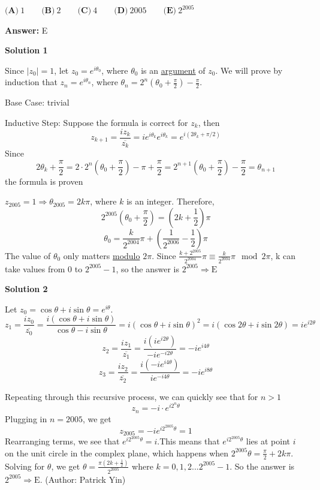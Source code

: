 \begin{enumerate}
 $\textbf{(A)}\ 1 \qquad  \textbf{(B)}\ 2 \qquad  \textbf{(C)}\ 4 \qquad  \textbf{(D)}\ 2005 \qquad  \textbf{(E)}\ 2^{2005}$

 \textbf{Answer: }E



\textbf{Solution 1}

Since $|z_0|=1$, let $z_0=e^{i\theta_0}$, where $\theta_0$ is an \href{https://artofproblemsolving.com/wiki/index.php?title=Argument}{argument} of $z_0$. We will prove by induction that $z_n=e^{i\theta_n}$, where $\theta_n=2^n(\theta_0+\frac{\pi}{2})-\frac{\pi}{2}$.

 Base Case: trivial

 Inductive Step: Suppose the formula is correct for $z_k$, then
 \[z_{k+1}=\frac{iz_k}{\overline {z_k}}=i e^{i\theta_k} e^{i\theta_k}=e^{i(2\theta_k+\pi/2)}\]Since
 \[2\theta_k+\frac{\pi}{2}=2\cdot 2^n(\theta_0+\frac{\pi}{2})-\pi+\frac{\pi}{2}=2^{n+1}(\theta_0+\frac{\pi}{2})-\frac{\pi}{2}=\theta_{n+1}\]the formula is proven

 $z_{2005}=1\Rightarrow \theta_{2005}=2k\pi$, where $k$ is an integer. Therefore,
 \[2^{2005}(\theta_0+\frac{\pi}{2})=(2k+\frac{1}{2})\pi\]
 \[\theta_0=\frac{k}{2^{2004}}\pi+\left(\frac{1}{2^{2006}}-\frac{1}{2}\right)\pi\]The value of $\theta_0$ only matters \href{https://artofproblemsolving.com/wiki/index.php?title=Modulo}{modulo} $2\pi$. Since $\frac{k+2^{2005}}{2^{2004}}\pi\equiv\frac{k}{2^{2004}}\pi\mod 2\pi$, k can take values from 0 to $2^{2005}-1$, so the answer is $2^{2005}\Rightarrow\boxed{\mathrm{E}}$




\textbf{Solution 2}

Let $z_0 = \cos \theta + i\sin \theta = e^{i\theta}$.
 \[z_1 = \frac {iz_{0}}{\overline {z_{0}}} = \frac{i(\cos \theta + i\sin \theta)}{\cos \theta - i\sin \theta} = i(\cos \theta + i\sin \theta)^2 = i(\cos 2\theta + i\sin 2\theta) = ie^{i2\theta}\]
 \[z_2 = \frac {iz_{1}}{\overline {z_{1}}} = \frac {i(ie^{i2\theta})}{-ie^{-i2\theta}} = -ie^{i4\theta}\]
 \[z_3 = \frac {iz_{2}}{\overline {z_{2}}} = \frac {i(-ie^{i4\theta})}{ie^{-i4\theta}} = -ie^{i8\theta}\]

 Repeating through this recursive process, we can quickly see that for $n>1$
 \[z_n = -i \cdot e^{i2^n\theta}\]Plugging in $n=2005$, we get 
 \[z_{2005} = -ie^{i2^{2005}\theta} = 1\]Rearranging terms, we see that $e^{i2^{2005}\theta}=i$.This means that $e^{i2^{2005}\theta}$ lies at point $i$ on the unit circle in the complex plane, which happens when $2^{2005}\theta = \frac{\pi}{2} + 2k\pi$. Solving for $\theta$, we get $\theta=\frac{\pi(2k+\frac{1}{2})}{2^{2005}}$ where $k = 0,1,2...2^{2005}-1$. So the answer is $2^{2005}\Rightarrow\boxed{\mathrm{E}}$. (Author: Patrick Yin)


\end{enumerate}
